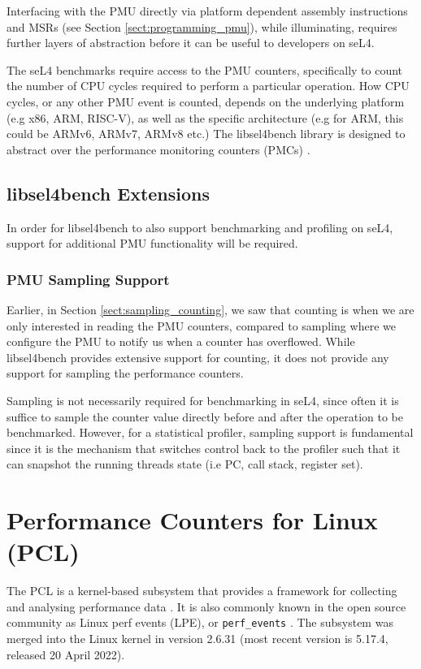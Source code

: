 Interfacing with the PMU directly via platform dependent assembly instructions and MSRs (see Section \ref{sect:programming_pmu}), while illuminating, requires further layers of abstraction before it can be useful to developers on seL4. 

The seL4 benchmarks require access to the PMU counters, specifically to count the number of CPU cycles required to perform a particular operation. How CPU cycles, or any other PMU event is counted, depends on the underlying platform (e.g x86, ARM, RISC-V), as well as the specific architecture (e.g for ARM, this could be ARMv6, ARMv7, ARMv8 etc.) The libsel4bench library is designed to abstract over the performance monitoring counters (PMCs) \cite{github_libsel4bench_sel4bench_header}.

\subsection{libsel4bench Extensions}

In order for libsel4bench to also support benchmarking and profiling on seL4, support for additional PMU functionality will be required. 

\subsubsection{PMU Sampling Support}
Earlier, in Section \ref{sect:sampling_counting}, we saw that counting is when we are only interested in reading the PMU counters, compared to sampling where we configure the PMU to notify us when a counter has overflowed. While libsel4bench provides extensive support for counting, it does not provide any support for sampling the performance counters.

Sampling is not necessarily required for benchmarking in seL4, since often it is suffice to sample the counter value directly before and after the operation to be benchmarked. However, for a statistical profiler, sampling support is fundamental since it is the mechanism that switches control back to the profiler such that it can snapshot the running threads state (i.e PC, call stack, register set).

\section{Performance Counters for Linux (PCL)}\label{sect:pcl}

The PCL is a kernel-based subsystem that provides a framework for collecting and analysing performance data \cite{DocsRedHatPCL}. It is also commonly known in the open source community as Linux perf events (LPE), or \texttt{perf\_events} \cite{BlogBrendandGreggPerf}. The subsystem was merged into the Linux kernel in version 2.6.31 \cite{DocsUnofficialLinxPerfEvents} (most recent version is 5.17.4, released 20 April 2022). 

